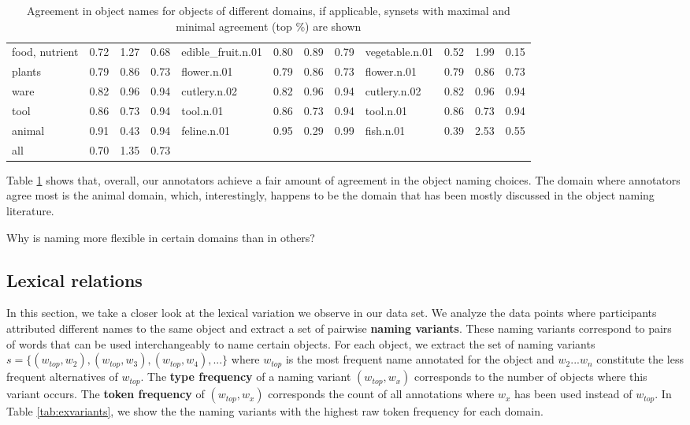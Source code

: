 \documentclass[11pt,a4paper]{article}
\begin{document}
\begin{table}
\begin{tabular}{llll|llll|llll}
                   food, nutrient &  0.72 &  1.27 &  0.68 &  edible\_fruit.n.01 &  0.80 &  0.89 &  0.79 &         vegetable.n.01 &  0.52 &  1.99 &  0.15 \\
         plants &  0.79 &  0.86 &  0.73 &        flower.n.01 &  0.79 &  0.86 &  0.73 &            flower.n.01 &  0.79 &  0.86 &  0.73 \\
                             ware &  0.82 &  0.96 &  0.94 &       cutlery.n.02 &  0.82 &  0.96 &  0.94 &           cutlery.n.02 &  0.82 &  0.96 &  0.94 \\
                             tool &  0.86 &  0.73 &  0.94 &          tool.n.01 &  0.86 &  0.73 &  0.94 &              tool.n.01 &  0.86 &  0.73 &  0.94 \\
                           animal &  0.91 &  0.43 &  0.94 &        feline.n.01 &  0.95 &  0.29 &  0.99 &              fish.n.01 &  0.39 &  2.53 &  0.55 \\
\bottomrule
 all &  0.70 &  1.35 &  0.73            \\

\bottomrule
\end{tabular}
\caption{Agreement in object names for objects of different domains, if applicable, synsets with maximal and minimal agreement (top \%) are shown }
\label{tab:agree}
\end{table}

Table \ref{tab:agree} shows that, overall, our annotators achieve a fair amount of agreement in the object naming choices. The domain where annotators agree most is the animal domain, which, interestingly, happens to be the domain that has been mostly discussed in the object naming literature. 

Why is naming more flexible in certain domains than in others?

\subsection{Lexical relations}

In this section, we take a closer look at the lexical variation we observe in our data set. We analyze the data points where participants attributed different names to the same object and extract a set of  pairwise \textbf{naming variants}. These naming variants correspond to pairs of words that can be used interchangeably to name certain objects.
For each object, we extract the set of naming variants $s = \{ (w_{top},w_2), (w_{top},w_3), (w_{top},w_4),... \}$  where $w_{top}$ is the most frequent name annotated for the object and $w_2 ... w_n$ constitute the less frequent alternatives of $w_{top}$.  The  \textbf{type frequency} of a naming variant $(w_{top},w_x)$ corresponds to the number of objects where this variant occurs. The \textbf{token frequency} of $(w_{top},w_x)$ corresponds the count of all annotations where $w_x$ has been used instead of $w_{top}$.
In Table \ref{tab:exvariants}, we show the the naming variants with the highest raw token frequency for each domain. 
\end{document}
